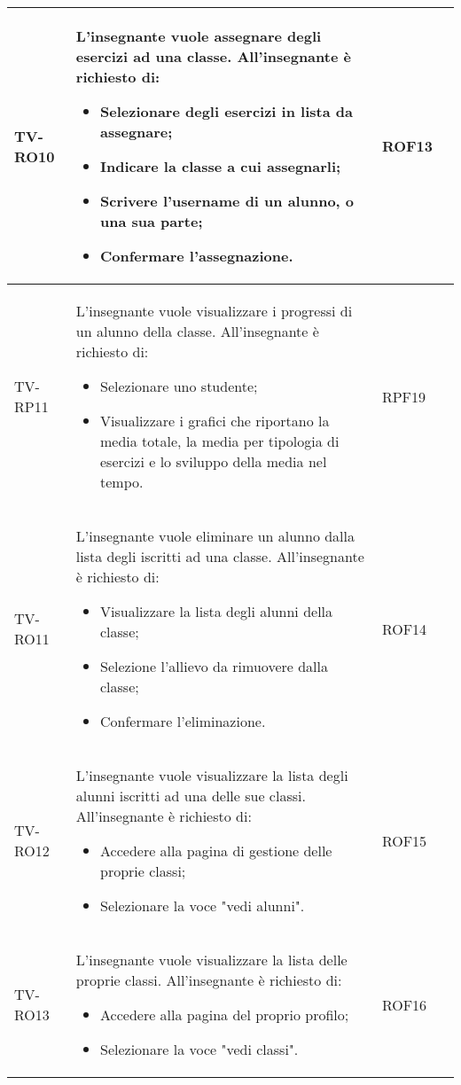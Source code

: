 \begin{longtable}{|>{\centering\arraybackslash}m{1.6cm}|>{\centering\arraybackslash}m{6.41cm}|>{\centering\arraybackslash}m{3.1cm} | >{\centering\arraybackslash}m{2.6cm}|}
		  \rowcolor{LightGray}
TV-RO10 & L'insegnante vuole assegnare degli esercizi ad una classe. All'insegnante è richiesto di:
\begin{itemize}
 \item Selezionare degli esercizi in lista da assegnare;
 \item Indicare la classe a cui assegnarli;
 \item Scrivere l'username di un alunno, o una sua parte;
 \item Confermare l'assegnazione.
\end{itemize}  & ROF13 \\ \hline

TV-RP11 & L'insegnante vuole visualizzare i progressi di un alunno della classe. All'insegnante è richiesto di:
\begin{itemize}
 \item Selezionare uno studente;
 \item Visualizzare i grafici che riportano la media totale, la media per tipologia di
 esercizi e lo sviluppo della media nel tempo.
\end{itemize}  & RPF19 \\ \hline
		
		  \rowcolor{LightGray}
	TV-RO11 & L'insegnante vuole eliminare un alunno dalla lista degli iscritti ad una classe. All'insegnante è richiesto di:
		\begin{itemize}
			\item Visualizzare la lista degli alunni della classe;
			\item Selezione l'allievo da rimuovere dalla classe;
			\item Confermare l'eliminazione.		
		\end{itemize}  & ROF14 \\ \hline	
		
		TV-RO12 & L'insegnante vuole visualizzare la lista degli alunni iscritti ad una delle sue classi. All'insegnante è richiesto di:
		\begin{itemize}
			\item Accedere alla pagina di gestione delle proprie classi;
			\item Selezionare la voce "vedi alunni".		
		\end{itemize}  & ROF15 \\ \hline
		
		  \rowcolor{LightGray}
		TV-RO13 & L'insegnante vuole visualizzare la lista delle proprie classi. All'insegnante è richiesto di:
		\begin{itemize}
			\item Accedere alla pagina del proprio profilo;
			\item Selezionare la voce "vedi classi".		
		\end{itemize}  & ROF16 \\ \hline
		

\end{longtable}
